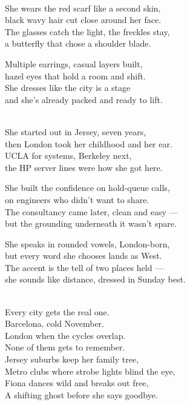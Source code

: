 \begin{lyrics}


\\
She wears the red scarf like a second skin,\\
black wavy hair cut close around her face.\\
The glasses catch the light, the freckles stay,\\
a butterfly that chose a shoulder blade.

Multiple earrings, casual layers built,\\
hazel eyes that hold a room and shift.\\
She dresses like the city is a stage\\
and she's already packed and ready to lift.


\\
She started out in Jersey, seven years,\\
then London took her childhood and her ear.\\
UCLA for systems, Berkeley next,\\
the HP server lines were how she got here.

She built the confidence on hold-queue calls,\\
on engineers who didn't want to share.\\
The consultancy came later, clean and easy —\\
but the grounding underneath it wasn't spare.

She speaks in rounded vowels, London-born,\\
but every word she chooses lands as West.\\
The accent is the tell of two places held —\\
she sounds like distance, dressed in Sunday best.

\\
Every city gets the real one.\\
Barcelona, cold November.\\
London when the cycles overlap.\\
None of them gets to remember.\\
Jersey suburbs keep her family tree,\\
Metro clubs where strobe lights blind the eye,\\
Fiona dances wild and breaks out free,\\
A shifting ghost before she says goodbye.


\end{lyrics}

